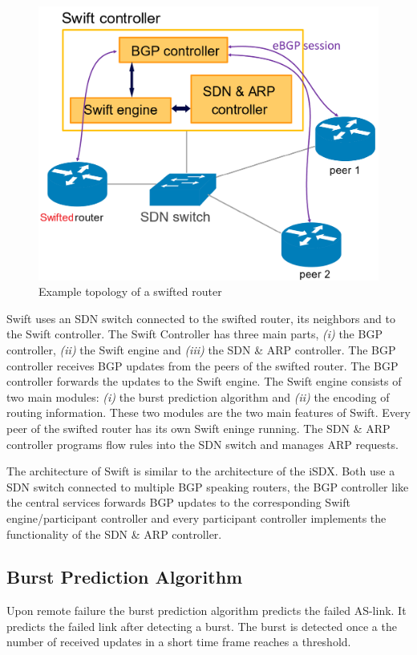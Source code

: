 \begin{figure}[h]
\center
\includegraphics[scale = 0.3]{Figures/swift_topo_cropped.pdf}
\caption{Example topology of a swifted router \cite{swift}}
\end{figure}

Swift uses an SDN switch connected to the swifted router, its neighbors and to the Swift controller. The Swift Controller has three main parts, \emph{(i)} the BGP controller, \emph{(ii)} the Swift engine and \emph{(iii)} the SDN \& ARP controller. The BGP controller receives BGP updates from the peers of the swifted router. The BGP controller forwards the updates to the Swift engine. The Swift engine consists of two main modules: \emph{(i)} the burst prediction algorithm and \emph{(ii)} the encoding of routing information. These two modules are the two main features of Swift. Every peer of the swifted router has its own Swift eninge running. The SDN \& ARP controller programs flow rules into the SDN switch and manages ARP requests. 

The architecture of Swift is similar to the architecture of the iSDX. Both use a SDN switch connected to multiple BGP speaking routers, the BGP controller like the central services forwards BGP updates to the corresponding Swift engine/participant controller and every participant controller implements the functionality of the SDN \& ARP controller. 

\subsection{\label{chapter2:Swift:BPA}Burst Prediction Algorithm}
Upon remote failure the burst prediction algorithm predicts the failed AS-link. It predicts the failed link after detecting a burst. The burst is detected once a the number of received updates in a short time frame reaches a threshold.

